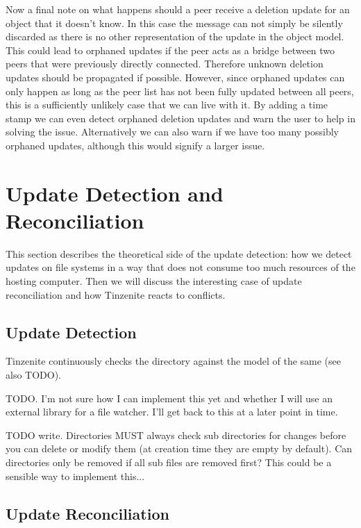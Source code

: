 Now a final note on what happens should a peer receive a deletion update for an object that it doesn't know.
In this case the message can not simply be silently discarded as there is no other representation of the update in the object model.
This could lead to orphaned updates if the peer acts as a bridge between two peers that were previously directly connected.
Therefore unknown deletion updates should be propagated if possible.
However, since orphaned updates can only happen as long as the peer list has not been fully updated between all peers, this is a sufficiently unlikely case that we can live with it.
By adding a time stamp we can even detect orphaned deletion updates and warn the user to help in solving the issue.
Alternatively we can also warn if we have too many possibly orphaned updates, although this would signify a larger issue.

\section{Update Detection and Reconciliation}
\label{sec:Update Detection and Reconciliation}

This section describes the theoretical side of the update detection: how we detect updates on file systems in a way that does not consume too much resources of the hosting computer.
Then we will discuss the interesting case of update reconciliation and how Tinzenite reacts to conflicts.

\subsection{Update Detection}
\label{sub:Update Detection}

Tinzenite continuously checks the directory against the model of the same (see also TODO).

TODO.
I'm not sure how I can implement this yet and whether I will use an external library for a file watcher.
I'll get back to this at a later point in time.

TODO write.
Directories MUST always check sub directories for changes before you can delete or modify them (at creation time they are empty by default).
Can directories only be removed if all sub files are removed first?
This could be a sensible way to implement this...

\subsection{Update Reconciliation}
\label{sub:Update Reconciliation}

